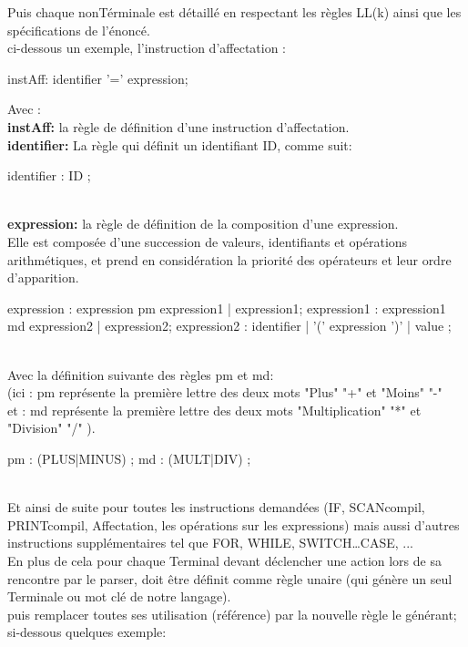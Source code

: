 \documentclass[12pt]{article}
\begin{document}
Puis chaque nonTérminale est détaillé en respectant les règles LL(k) ainsi que les spécifications de l'énoncé. \\
ci-dessous un exemple, l'instruction d'affectation :
\begin{sql}
instAff:    identifier '=' expression;
\end{sql}
Avec : \\
\textbf{instAff:} la règle de définition d'une instruction d'affectation.\\
\textbf{identifier:} La règle qui définit un identifiant ID, comme suit:
\begin{sql}
identifier : ID ;
\end{sql}
\texttt{ }\\
\textbf{expression:} la règle de définition de la composition d'une expression.\\
Elle est composée d'une succession de valeurs, identifiants et opérations arithmétiques, et prend en considération la priorité des opérateurs et leur ordre d'apparition.
\begin{sql}
expression : expression pm expression1 | expression1;
expression1 : expression1 md expression2 | expression2;
expression2 : identifier | '(' expression ')' | value ;
\end{sql}
\texttt{ }\\
Avec la définition suivante des règles pm et md:\\
(ici : pm représente la première lettre des deux mots "Plus" "+" et "Moins" "-"\\
et : md représente la première lettre des deux mots "Multiplication" "*" et "Division" "/" ).

\begin{sql} 
pm : (PLUS|MINUS) ;
md : (MULT|DIV) ;
\end{sql}
\texttt{ }\\

Et ainsi de suite pour toutes les instructions demandées (IF, SCANcompil, PRINTcompil, Affectation, les opérations sur les expressions) mais aussi d'autres instructions supplémentaires tel que FOR, WHILE, SWITCH…CASE, ... \\

En plus de cela pour chaque Terminal devant déclencher une action lors de sa rencontre par le parser, doit être définit comme règle unaire (qui génère un seul Terminale ou mot clé de notre langage).\\
puis remplacer toutes ses utilisation (référence) par la nouvelle règle le générant; si-dessous quelques exemple:\\
\end{document}
